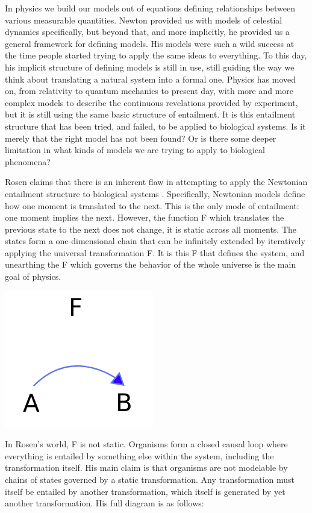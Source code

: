 \documentclass[12pt]{article}
\begin{document}
In physics we build our models out of equations defining relationships between various measurable quantities.  Newton provided us with models of celestial dynamics specifically, but beyond that, and more implicitly, he provided us a general framework for defining models.  His models were such a wild success at the time people started trying to apply the same ideas to everything.  To this day, his implicit structure of defining models is still in use, still guiding the way we think about translating a natural system into a formal one.  Physics has moved on, from relativity to quantum mechanics to present day, with more and more complex models to describe the continuous revelations provided by experiment, but it is still using the same basic structure of entailment.  It is this entailment structure that has been tried, and failed, to be applied to biological systems.  Is it merely that the right model has not been found?  Or is there some deeper limitation in what kinds of models we are trying to apply to biological phenomena?

Rosen claims that there is an inherent flaw in attempting to apply the Newtonian entailment structure to biological systems \cite{Rosen}.  Specifically, Newtonian models define how one moment is translated to the next.  This is the only mode of entailment: one moment implies the next.  However, the function F which translates the previous state to the next does not change, it is static across all moments.  The states form a one-dimensional chain that can be infinitely extended by iteratively applying the universal transformation F.  It is this F that defines the system, and unearthing the F which governs the behavior of the whole universe is the main goal of physics.  

\begin{center}
\includegraphics[scale=0.6]{newton.png}
\end{center}

In Rosen's world, F is not static.  Organisms form a closed causal loop where everything is entailed by something else within the system, including the transformation itself.  His main claim is that organisms are not modelable by chains of states governed by a static transformation.  Any transformation must itself be entailed by another transformation, which itself is generated by yet another transformation.  His full diagram is as follows:
\end{document}
